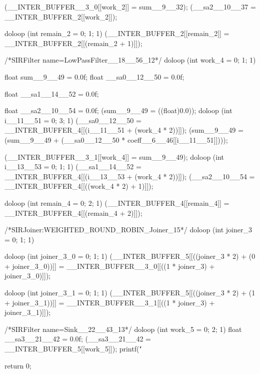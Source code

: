 \documentclass[10pt, letterpaper, onecolumn]{article}
\begin{document}
\begin{verbatimtab}[4]
{{{{	  (__INTER_BUFFER__3_0[[work_2]] = sum__9__32);
	  (__sa2__10__37 = __INTER_BUFFER_2[[work_2]]);
	}

      doloop (int remain_2 = 0; 1; 1) 
	(__INTER_BUFFER_2[[remain_2]] = 
	 __INTER_BUFFER_2[[(remain_2 + 1)]]);
    
/*SIRFilter name=LowPassFilter__18__56_12*/
      doloop (int work_4 = 0; 1; 1) 
	{
	  float sum__9__49 = 0.0f;
	  float __sa0__12__50 = 0.0f;

	  float __sa1__14__52 = 0.0f;

	  float __sa2__10__54 = 0.0f;
	  (sum__9__49 = ((float)0.0));
	  doloop (int i__11__51 = 0; 3; 1) 
	    {
	      (__sa0__12__50 = 
	       __INTER_BUFFER_4[[(i__11__51 + (work_4 * 2))]]);
	      (sum__9__49 = 
	       (sum__9__49 + (__sa0__12__50 * coeff__6__46[[i__11__51]])));
	    }

	  (__INTER_BUFFER__3_1[[work_4]] = sum__9__49);
	  doloop (int i__13__53 = 0; 1; 1) {
	    (__sa1__14__52 = 
	     __INTER_BUFFER_4[[(i__13__53 + (work_4 * 2))]]);
	  }
	  (__sa2__10__54 = __INTER_BUFFER_4[[((work_4 * 2) + 1)]]);
	}

      doloop (int remain_4 = 0; 2; 1) 
	(__INTER_BUFFER_4[[remain_4]] = __INTER_BUFFER_4[[(remain_4 + 2)]]);
    
/*SIRJoiner:WEIGHTED_ROUND_ROBIN_Joiner_15*/
      doloop (int joiner_3 = 0; 1; 1) 
	{
	  doloop (int joiner_3_0 = 0; 1; 1) 
	    (__INTER_BUFFER_5[[((joiner_3 * 2) + (0 + joiner_3_0))]] = 
	     __INTER_BUFFER__3_0[[((1 * joiner_3) + joiner_3_0)]]);

	  doloop (int joiner_3_1 = 0; 1; 1) 
	    (__INTER_BUFFER_5[[((joiner_3 * 2) + (1 + joiner_3_1))]] = 
	     __INTER_BUFFER__3_1[[((1 * joiner_3) + joiner_3_1)]]);

	}
    
/*SIRFilter name=Sink__22__43_13*/
      doloop (int work_5 = 0; 2; 1) 
	{
	  float __sa3__21__42 = 0.0f;
	  (__sa3__21__42 = __INTER_BUFFER_5[[work_5]]);
	  printf("%
	}

    }
    return 0;
  }
}
\end{verbatimtab}


{\small


}
\end{document}
